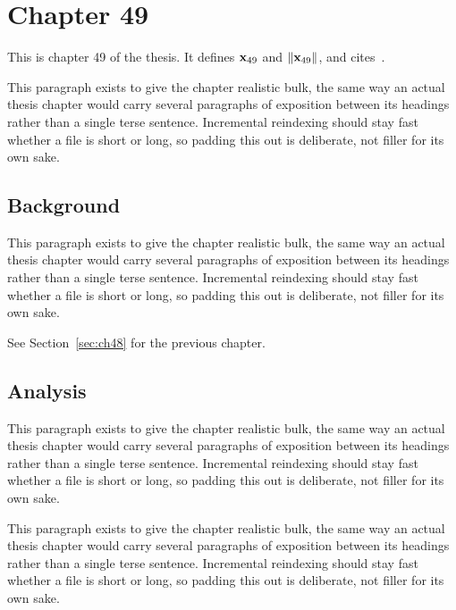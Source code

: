 \section{Chapter 49}
\label{sec:ch49}

This is chapter 49 of the thesis. It defines $\mathbf{x}_{49}$ and $\lVert \mathbf{x}_{49} \rVert$, and cites~\cite{ref1}.

This paragraph exists to give the chapter realistic bulk, the same way an actual thesis chapter would carry several paragraphs of exposition between its headings rather than a single terse sentence. Incremental reindexing should stay fast whether a file is short or long, so padding this out is deliberate, not filler for its own sake.

\subsection{Background}
\label{sec:ch49:background}

This paragraph exists to give the chapter realistic bulk, the same way an actual thesis chapter would carry several paragraphs of exposition between its headings rather than a single terse sentence. Incremental reindexing should stay fast whether a file is short or long, so padding this out is deliberate, not filler for its own sake.

See Section~\ref{sec:ch48} for the previous chapter.

\subsection{Analysis}
\label{sec:ch49:analysis}

This paragraph exists to give the chapter realistic bulk, the same way an actual thesis chapter would carry several paragraphs of exposition between its headings rather than a single terse sentence. Incremental reindexing should stay fast whether a file is short or long, so padding this out is deliberate, not filler for its own sake.

This paragraph exists to give the chapter realistic bulk, the same way an actual thesis chapter would carry several paragraphs of exposition between its headings rather than a single terse sentence. Incremental reindexing should stay fast whether a file is short or long, so padding this out is deliberate, not filler for its own sake.

